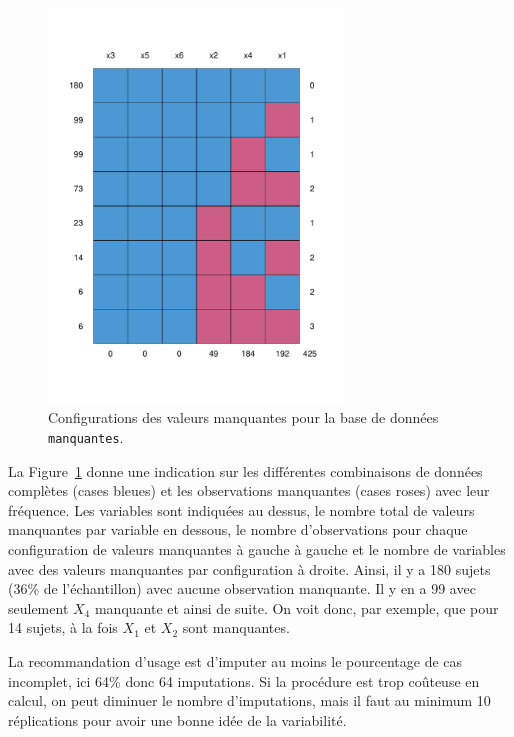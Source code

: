 \documentclass[
  11pt,
  letterpaper,
]{scrbook}
\theoremstyle{definition}
\theoremstyle{remark}
\begin{document}
\begin{figure}[ht!]

{\centering \includegraphics[width=0.7\textwidth,height=\textheight]{donneesmanquantes_files/figure-pdf/fig-manquantes2-1.pdf}

}

\caption{\label{fig-manquantes2}Configurations des valeurs manquantes
pour la base de données \texttt{manquantes}.}

\end{figure}

La Figure~\ref{fig-manquantes2} donne une indication sur les différentes
combinaisons de données complètes (cases bleues) et les observations
manquantes (cases roses) avec leur fréquence. Les variables sont
indiquées au dessus, le nombre total de valeurs manquantes par variable
en dessous, le nombre d'observations pour chaque configuration de
valeurs manquantes à gauche à gauche et le nombre de variables avec des
valeurs manquantes par configuration à droite. Ainsi, il y a 180 sujets
(36\% de l'échantillon) avec aucune observation manquante. Il y en a 99
avec seulement \(X_4\) manquante et ainsi de suite. On voit donc, par
exemple, que pour 14 sujets, à la fois \(X_1\) et \(X_2\) sont
manquantes.

La recommandation d'usage est d'imputer au moins le pourcentage de cas
incomplet, ici 64\% donc 64 imputations. Si la procédure est trop
coûteuse en calcul, on peut diminuer le nombre d'imputations, mais il
faut au minimum 10 réplications pour avoir une bonne idée de la
variabilité.
\end{document}
